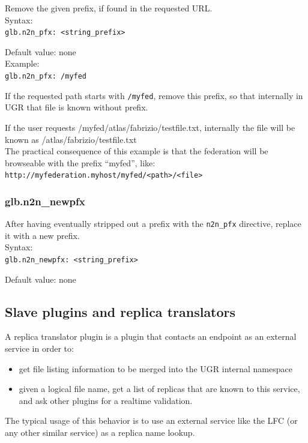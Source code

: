 \documentclass[12pt]{article} %
\begin{document}
Remove the given prefix, if found in the requested URL.\\
Syntax:\\
\lstinline"glb.n2n_pfx: <string_prefix>"

Default value: none
\\
Example:\\

\lstinline"glb.n2n_pfx: /myfed"

If the requested path starts with \lstinline"/myfed", remove this prefix, so that internally in UGR that file is known without prefix.

If the user requests /myfed/atlas/fabrizio/testfile.txt, internally the file will be known as /atlas/fabrizio/testfile.txt\\
The practical consequence of this example is that the federation will be browseable with the prefix ``myfed'', like:\\
\lstinline"http://myfederation.myhost/myfed/<path>/<file>"
 
\subsubsection{glb.n2n\_newpfx}

After having eventually stripped out a prefix with the \lstinline"n2n_pfx" directive, replace it with a new prefix.\\
Syntax:\\
\lstinline"glb.n2n_newpfx: <string_prefix>"

Default value: none


\subsection{Slave plugins and replica translators}

A replica translator plugin is a plugin that contacts an endpoint as an external service in order to:

\begin{itemize}
 \item get file listing information to be merged into the UGR internal namespace
 \item given a logical file name, get a list of replicas that are known to this service, and ask other plugins for a realtime validation.
\end{itemize}

The typical usage of this behavior is to use an external service like the LFC (or any other similar service) as a replica name lookup.\\
\end{document}

